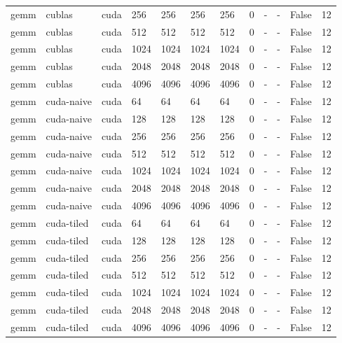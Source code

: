 \begin{tabular}{llllllllllll}
gemm & cublas & cuda & 256 & 256 & 256 & 256 & 0 & - & - & False & 12 \\
gemm & cublas & cuda & 512 & 512 & 512 & 512 & 0 & - & - & False & 12 \\
gemm & cublas & cuda & 1024 & 1024 & 1024 & 1024 & 0 & - & - & False & 12 \\
gemm & cublas & cuda & 2048 & 2048 & 2048 & 2048 & 0 & - & - & False & 12 \\
gemm & cublas & cuda & 4096 & 4096 & 4096 & 4096 & 0 & - & - & False & 12 \\
gemm & cuda-naive & cuda & 64 & 64 & 64 & 64 & 0 & - & - & False & 12 \\
gemm & cuda-naive & cuda & 128 & 128 & 128 & 128 & 0 & - & - & False & 12 \\
gemm & cuda-naive & cuda & 256 & 256 & 256 & 256 & 0 & - & - & False & 12 \\
gemm & cuda-naive & cuda & 512 & 512 & 512 & 512 & 0 & - & - & False & 12 \\
gemm & cuda-naive & cuda & 1024 & 1024 & 1024 & 1024 & 0 & - & - & False & 12 \\
gemm & cuda-naive & cuda & 2048 & 2048 & 2048 & 2048 & 0 & - & - & False & 12 \\
gemm & cuda-naive & cuda & 4096 & 4096 & 4096 & 4096 & 0 & - & - & False & 12 \\
gemm & cuda-tiled & cuda & 64 & 64 & 64 & 64 & 0 & - & - & False & 12 \\
gemm & cuda-tiled & cuda & 128 & 128 & 128 & 128 & 0 & - & - & False & 12 \\
gemm & cuda-tiled & cuda & 256 & 256 & 256 & 256 & 0 & - & - & False & 12 \\
gemm & cuda-tiled & cuda & 512 & 512 & 512 & 512 & 0 & - & - & False & 12 \\
gemm & cuda-tiled & cuda & 1024 & 1024 & 1024 & 1024 & 0 & - & - & False & 12 \\
gemm & cuda-tiled & cuda & 2048 & 2048 & 2048 & 2048 & 0 & - & - & False & 12 \\
gemm & cuda-tiled & cuda & 4096 & 4096 & 4096 & 4096 & 0 & - & - & False & 12 \\
\hline
\end{tabular}
